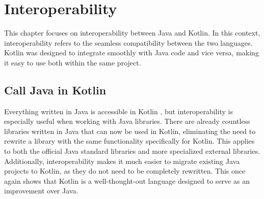 \documentclass[a4paper,11pt]{article}
\begin{document}
\section{Interoperability}
This chapter focuses on interoperability between Java and Kotlin. In this context, interoperability refers to the seamless compatibility between the two languages. Kotlin was designed to integrate smoothly with Java code and vice versa, making it easy to use both within the same project.

\subsection{Call Java in Kotlin}
Everything written in Java is accessible in Kotlin \cite{interop}, but interoperability is especially useful when working with Java libraries. There are already countless libraries written in Java that can now be used in Kotlin, eliminating the need to rewrite a library with the same functionality specifically for Kotlin. This applies to both the official Java standard libraries and more specialized external libraries. Additionally, interoperability makes it much easier to migrate existing Java projects to Kotlin, as they do not need to be completely rewritten. This once again shows that Kotlin is a well-thought-out language designed to serve as an improvement over Java.
\end{document}
